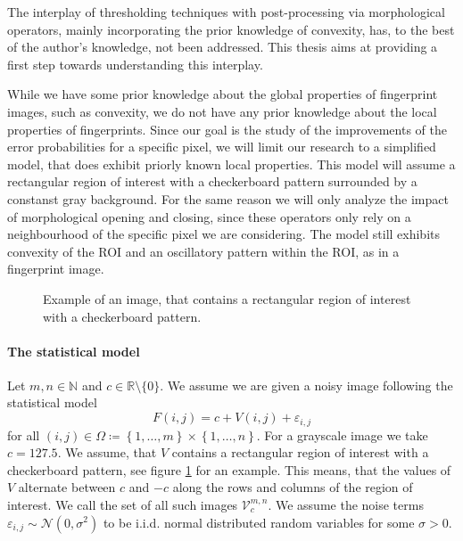 \documentclass[a4paper,12pt]{article}
\theoremstyle{plain}
\theoremstyle{definition}
\begin{document}
The interplay of thresholding techniques with post-processing via morphological operators, mainly incorporating the prior knowledge of convexity, has, to the best of the author's knowledge, not been addressed. This thesis aims at providing a first step towards understanding this interplay.

While we have some prior knowledge about the global properties of fingerprint images, such as convexity, we do not have any prior knowledge about the local properties of fingerprints. Since our goal is the study of the improvements of the error probabilities for a specific pixel, we will limit our research to a simplified model, that does exhibit priorly known local properties. This model will assume a rectangular region of interest with a checkerboard pattern surrounded by a constanst gray background. For the same reason we will only analyze the impact of morphological opening and closing, since these operators only rely on a neighbourhood of the specific pixel we are considering. The model still exhibits convexity of the ROI and an oscillatory pattern within the ROI, as in a fingerprint image.

\begin{figure}[h]
	\centering
	\caption{Example of an image, that contains a rectangular region of interest with a checkerboard pattern.}
	\label{examplerROI}
\end{figure}

\paragraph{The statistical model}

Let $m, n \in \mathbb{N}$ and $c \in \mathbb{R} \setminus \{ 0 \}$. We assume we are given a noisy image following the statistical model
\begin{equation}\label{introductionstatmodel}
	F(i, j) = c + V(i, j) + \varepsilon_{i, j}
\end{equation}
for all $(i, j) \in \Omega \coloneqq \left\{ 1, \dots, m \right\} \times \left\{ 1, \dots, n \right\}$. For a grayscale image we take $c = 127.5$. We assume, that $V$ contains a rectangular region of interest with a checkerboard pattern, see figure \ref{examplerROI} for an example. This means, that the values of $V$ alternate between $c$ and $-c$ along the rows and columns of the region of interest. We call the set of all such images $\mathcal{V}_c^{m, n}$. We assume the noise terms $\varepsilon_{i, j} \sim \mathcal{N}(0, \sigma^2)$ to be i.i.d. normal distributed random variables for some $\sigma > 0$.
\end{document}

